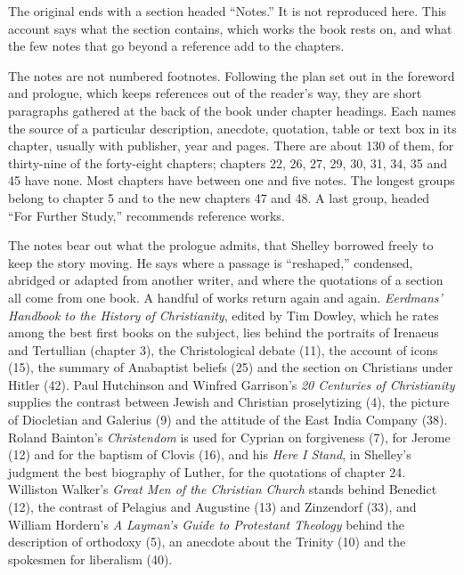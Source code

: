 
\noindent The original ends with a section headed ``Notes.'' It is not reproduced here. This account
says what the section contains, which works the book rests on, and what the few notes that go beyond
a reference add to the chapters.

The notes are not numbered footnotes. Following the plan set out in the foreword and prologue, which
keeps references out of the reader's way, they are short paragraphs gathered at the back of the book
under chapter headings. Each names the source of a particular description, anecdote, quotation,
table or text box in its chapter, usually with publisher, year and pages. There are about 130 of
them, for thirty-nine of the forty-eight chapters; chapters 22, 26, 27, 29, 30, 31, 34, 35 and 45
have none. Most chapters have between one and five notes. The longest groups belong to chapter 5 and
to the new chapters 47 and 48. A last group, headed ``For Further Study,'' recommends reference
works.

The notes bear out what the prologue admits, that Shelley borrowed freely to keep the story moving.
He says where a passage is ``reshaped,'' condensed, abridged or adapted from another writer, and
where the quotations of a section all come from one book. A handful of works return again and again.
\emph{Eerdmans' Handbook to the History of Christianity}, edited by Tim Dowley, which he rates among the best first books on the subject, lies behind the portraits of Irenaeus and
Tertullian (chapter 3), the Christological debate (11), the account of icons (15), the summary of
Anabaptist beliefs (25) and the section on Christians under Hitler (42). Paul Hutchinson and Winfred
Garrison's \emph{20 Centuries of Christianity} supplies the contrast between Jewish and Christian
proselytizing (4), the picture of Diocletian and Galerius (9) and the attitude of the East India
Company (38). Roland Bainton's \emph{Christendom} is used for Cyprian on forgiveness (7), for Jerome
(12) and for the baptism of Clovis (16), and his \emph{Here I Stand}, in Shelley's judgment the best
biography of Luther, for the quotations of chapter 24. Williston Walker's \emph{Great Men of the
Christian Church} stands behind Benedict (12), the contrast of Pelagius and Augustine (13) and
Zinzendorf (33), and William Hordern's \emph{A Layman's Guide to Protestant Theology} behind the
description of orthodoxy (5), an anecdote about the Trinity (10) and the spokesmen for liberalism
(40).

